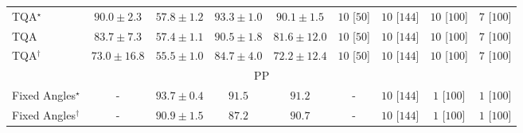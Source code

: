 \begin{tabular}{l|cccc|cccc|}
TQA$^\star$ & {\cellcolor[HTML]{B03F03}} \color[HTML]{F1F1F1} $90.0\pm 2.3$ & {\cellcolor[HTML]{FFF7BE}} \color[HTML]{000000} $57.8\pm 1.2$ & {\cellcolor[HTML]{933204}} \color[HTML]{F1F1F1} $93.3\pm 1.0$ & {\cellcolor[HTML]{B03F03}} \color[HTML]{F1F1F1} $90.1\pm 1.5$ & {\cellcolor[HTML]{FFF6F2}} \color[HTML]{000000} $10$ [$50$] & {\cellcolor[HTML]{FFF6F2}} \color[HTML]{000000} $10$ [$144$] & {\cellcolor[HTML]{FFF6F2}} \color[HTML]{000000} $10$ [$100$] & {\cellcolor[HTML]{FFF6F2}} \color[HTML]{000000} $7$ [$100$] \\
TQA & {\cellcolor[HTML]{DD5F0C}} \color[HTML]{F1F1F1} $83.7\pm 7.3$ & {\cellcolor[HTML]{FFF8C2}} \color[HTML]{000000} $57.4\pm 1.1$ & {\cellcolor[HTML]{AB3C03}} \color[HTML]{F1F1F1} $90.5\pm 1.8$ & {\cellcolor[HTML]{E96D13}} \color[HTML]{F1F1F1} $81.6\pm 12.0$ & {\cellcolor[HTML]{FFF6F2}} \color[HTML]{000000} $10$ [$50$] & {\cellcolor[HTML]{FFF6F2}} \color[HTML]{000000} $10$ [$144$] & {\cellcolor[HTML]{FFF6F2}} \color[HTML]{000000} $10$ [$100$] & {\cellcolor[HTML]{FFF6F2}} \color[HTML]{000000} $7$ [$100$] \\
TQA$^\dagger$ & {\cellcolor[HTML]{FEAB39}} \color[HTML]{000000} $73.0\pm 16.8$ & {\cellcolor[HTML]{FFFBCF}} \color[HTML]{000000} $55.5\pm 1.0$ & {\cellcolor[HTML]{D85A09}} \color[HTML]{F1F1F1} $84.7\pm 4.0$ & {\cellcolor[HTML]{FEB13E}} \color[HTML]{000000} $72.2\pm 12.4$ & {\cellcolor[HTML]{FFF6F2}} \color[HTML]{000000} $10$ [$50$] & {\cellcolor[HTML]{FFF6F2}} \color[HTML]{000000} $10$ [$144$] & {\cellcolor[HTML]{FFF6F2}} \color[HTML]{000000} $10$ [$100$] & {\cellcolor[HTML]{FFF6F2}} \color[HTML]{000000} $7$ [$100$] \\
\cline{1-9}
\multicolumn{9}{c}{\rule{0pt}{8pt}PP} \\
\midrule
Fixed Angles$^\star$ & {\cellcolor[HTML]{000000}} \color[HTML]{F1F1F1} {\cellcolor{white}} \color{black} - & {\cellcolor[HTML]{006234}} \color[HTML]{F1F1F1} $93.7\pm 0.4$ & {\cellcolor[HTML]{076D39}} \color[HTML]{F1F1F1} $91.5$ & {\cellcolor[HTML]{096F3A}} \color[HTML]{F1F1F1} $91.2$ & {\cellcolor[HTML]{000000}} \color[HTML]{F1F1F1} {\cellcolor{white}} \color{black} - & {\cellcolor[HTML]{FFF6F2}} \color[HTML]{000000} $10$ [$144$] & {\cellcolor[HTML]{FFF7F3}} \color[HTML]{000000} $1$ [$100$] & {\cellcolor[HTML]{FFF7F3}} \color[HTML]{000000} $1$ [$100$] \\
Fixed Angles$^\dagger$ & {\cellcolor[HTML]{000000}} \color[HTML]{F1F1F1} {\cellcolor{white}} \color{black} - & {\cellcolor[HTML]{0A703A}} \color[HTML]{F1F1F1} $90.9\pm 1.5$ & {\cellcolor[HTML]{218242}} \color[HTML]{F1F1F1} $87.2$ & {\cellcolor[HTML]{0B713B}} \color[HTML]{F1F1F1} $90.7$ & {\cellcolor[HTML]{000000}} \color[HTML]{F1F1F1} {\cellcolor{white}} \color{black} - & {\cellcolor[HTML]{FFF6F2}} \color[HTML]{000000} $10$ [$144$] & {\cellcolor[HTML]{FFF7F3}} \color[HTML]{000000} $1$ [$100$] & {\cellcolor[HTML]{FFF7F3}} \color[HTML]{000000} $1$ [$100$] \\

\end{tabular}
